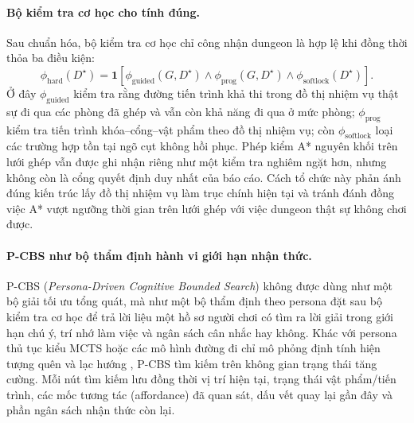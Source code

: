 \documentclass[oneside,a4paper,12pt]{extreport}
\begin{document}
\paragraph{Bộ kiểm tra cơ học cho tính đúng.}
Sau chuẩn hóa, bộ kiểm tra cơ học chỉ công nhận dungeon là hợp lệ khi đồng thời thỏa ba điều kiện:
\begin{equation}
\phi_{\mathrm{hard}}(D^{\star})=
\mathbf{1}\!\left[
\phi_{\mathrm{guided}}(G,D^{\star}) \land
\phi_{\mathrm{prog}}(G,D^{\star}) \land
\phi_{\mathrm{softlock}}(D^{\star})
\right].
\end{equation}
Ở đây $\phi_{\mathrm{guided}}$ kiểm tra rằng đường tiến trình khả thi trong đồ
thị nhiệm vụ thật sự đi qua các phòng đã ghép và vẫn còn khả năng đi qua ở mức
phòng; $\phi_{\mathrm{prog}}$ kiểm tra tiến trình khóa--cổng--vật phẩm theo đồ
thị nhiệm vụ; còn $\phi_{\mathrm{softlock}}$ loại các trường hợp tồn tại ngõ
cụt không hồi phục. Phép kiểm A* nguyên khối trên lưới ghép vẫn được ghi nhận
riêng như một kiểm tra nghiêm ngặt hơn, nhưng không còn là cổng quyết định duy
nhất của báo cáo. Cách tổ chức này phản ánh đúng kiến trúc lấy đồ thị nhiệm vụ
làm trục chính hiện tại và tránh đánh đồng việc A* vượt ngưỡng thời gian trên
lưới ghép với việc dungeon
thật sự không chơi được.

\paragraph{P-CBS như bộ thẩm định hành vi giới hạn nhận thức.}
P-CBS (\emph{Persona-Driven Cognitive Bounded Search}) không được dùng như một bộ giải tối ưu tổng quát, mà như một bộ thẩm định theo persona đặt sau bộ kiểm tra cơ học để trả lời liệu một hồ sơ người chơi có tìm ra lời giải trong giới hạn chú ý, trí nhớ làm việc và ngân sách cân nhắc hay không. Khác với persona thủ tục kiểu MCTS hoặc các mô hình đường đi chỉ mô phỏng định tính hiện tượng quên và lạc hướng \cite{holmgard2018proceduralpersonas,ariyurek2023beyondpersonas,rahmani2022humanlikepath,dubey2022cognitivepath}, P-CBS tìm kiếm trên không gian trạng thái tăng cường. Mỗi nút tìm kiếm lưu đồng thời vị trí hiện tại, trạng thái vật phẩm/tiến trình, các mốc tương tác (affordance) đã quan sát, dấu vết quay lại gần đây và phần ngân sách nhận thức còn lại.
\end{document}
